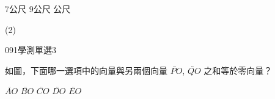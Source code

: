 \begin{QUESTIONS}
\begin{QUESTION}
\begin{QBODY}
\begin{QOPS}
                \QOP 7公尺 
                \QOP 9公尺 
                 公尺
            \end{QOPS}
        \end{QBODY}
        \begin{QFROMS}
        \end{QFROMS}
        \begin{QTAGS}\end{QTAGS}
        \begin{QANS}
            (2)
        \end{QANS}
        \begin{QSOLLIST}
        \end{QSOLLIST}
        \begin{QEMPTYSPACE}
        \end{QEMPTYSPACE}
    \end{QUESTION}
    \begin{QUESTION}
        \begin{ExamInfo}{091}{學測}{單選}{3}
        \end{ExamInfo}
        \begin{ExamAnsRateInfo}{62}{94}{65}{27}
        \end{ExamAnsRateInfo}
        \begin{QBODY}
            如圖，下面哪一選項中的向量與另兩個向量 $\lvec{PO}$, $\lvec{QO}$ 之和等於零向量？
            \begin{QOPS} 
                \QOP $\lvec{AO}$ 
                \QOP $\lvec{BO}$ 
                \QOP $\lvec{CO}$ 
                \QOP $\lvec{DO}$ 
                \QOP $\lvec{EO}$ 
            \end{QOPS}



\end{QBODY}
\end{QUESTION}
\end{QUESTIONS}
